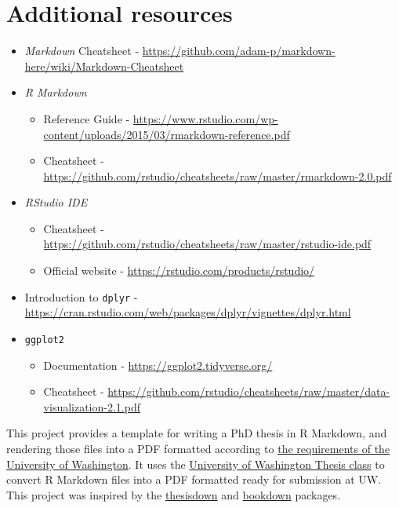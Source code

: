 \hypertarget{additional-resources}{%
\section{Additional resources}\label{additional-resources}}
\begin{itemize}
\item
  \emph{Markdown} Cheatsheet - \url{https://github.com/adam-p/markdown-here/wiki/Markdown-Cheatsheet}
\item
  \emph{R Markdown}
  \begin{itemize}
  \tightlist
  \item
    Reference Guide - \url{https://www.rstudio.com/wp-content/uploads/2015/03/rmarkdown-reference.pdf}
  \item
    Cheatsheet - \url{https://github.com/rstudio/cheatsheets/raw/master/rmarkdown-2.0.pdf}
  \end{itemize}
\item
  \emph{RStudio IDE}
  \begin{itemize}
  \tightlist
  \item
    Cheatsheet - \url{https://github.com/rstudio/cheatsheets/raw/master/rstudio-ide.pdf}
  \item
    Official website - \url{https://rstudio.com/products/rstudio/}
  \end{itemize}
\item
  Introduction to \texttt{dplyr} - \url{https://cran.rstudio.com/web/packages/dplyr/vignettes/dplyr.html}
\item
  \texttt{ggplot2}
  \begin{itemize}
  \tightlist
  \item
    Documentation - \url{https://ggplot2.tidyverse.org/}
  \item
    Cheatsheet - \url{https://github.com/rstudio/cheatsheets/raw/master/data-visualization-2.1.pdf}
  \end{itemize}
\end{itemize}
This project provides a template for writing a PhD thesis in R Markdown, and rendering those files into a PDF formatted according to \href{https://grad.uw.edu/for-students-and-post-docs/degree-requirements/thesisdissertation/final-submission-of-your-thesisdissertation/}{the requirements of the University of Washington}. It uses the \href{http://staff.washington.edu/fox/tex/}{University of Washington Thesis class} to convert R Markdown files into a PDF formatted ready for submission at UW. This project was inspired by the \href{https://github.com/ismayc/thesisdown}{thesisdown} and \href{https://github.com/rstudio/bookdown}{bookdown} packages.


